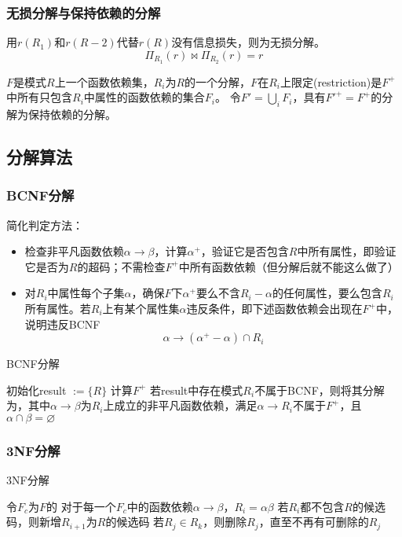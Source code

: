 \subsubsection{无损分解与保持依赖的分解}
\begin{definition}[无损分解]
用$r(R_1)$和$r(R-2)$代替$r(R)$没有信息损失，则为无损分解。
\[\Pi_{R_1}(r)\Join\Pi_{R_2}(r)=r\]
\end{definition}

\begin{definition}[保持依赖的分解]
$F$是模式$R$上一个函数依赖集，$R_i$为$R$的一个分解，$F$在$R_i$上限定(restriction)是$F^+$中所有只包含$R_i$中属性的函数依赖的集合$F_i$。
令$F'=\bigcup_i F_i$，具有$F'^+=F^+$的分解为保持依赖的分解。
\end{definition}

\subsection{分解算法}
\subsubsection{BCNF分解}
简化判定方法：
\begin{itemize}
	\item 检查非平凡函数依赖$\alpha\to\beta$，计算$\alpha^+$，验证它是否包含$R$中所有属性，即验证它是否为$R$的超码；不需检查$F^+$中所有函数依赖（但分解后就不能这么做了）
	\item 对$R_i$中属性每个子集$\alpha$，确保$F$下$\alpha^+$要么不含$R_i-\alpha$的任何属性，要么包含$R_i$所有属性。若$R_i$上有某个属性集$\alpha$违反条件，即下述函数依赖会出现在$F^+$中，说明违反BCNF
	\[\alpha\to(\alpha^+-\alpha)\cap R_i\]
\end{itemize}
\begin{algorithm}
\caption{BCNF分解}
\begin{algorithmic}[1]
\State 初始化result $:=\{R\}$
\State 计算$F^+$
\State 若result中存在模式$R_i$不属于BCNF，则将其分解为，其中$\alpha\to\beta$为$R_i$上成立的非平凡函数依赖，满足$\alpha\to R_i$不属于$F^+$，且$\alpha\cap\beta=\varnothing$
\end{algorithmic}
\end{algorithm}

\subsubsection{3NF分解}
\begin{algorithm}
\caption{3NF分解}
\begin{algorithmic}[1]
\State 令$F_c$为$F$的
\State 对于每一个$F_c$中的函数依赖$\alpha\to\beta$，$R_i=\alpha\beta$
\State 若$R_i$都不包含$R$的候选码，则新增$R_{i+1}$为$R$的候选码
\State 若$R_j\in R_k$，则删除$R_j$，直至不再有可删除的$R_j$
\end{algorithmic}
\end{algorithm}

